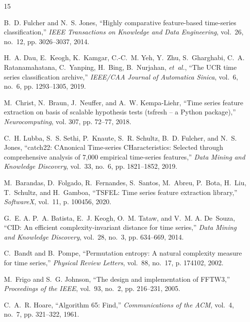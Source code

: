 \documentclass[conference]{IEEEtran}
\begin{document}
\begin{thebibliography}{15}

B.~D. Fulcher and N.~S. Jones, ``Highly comparative feature-based time-series classification,'' \emph{IEEE Transactions on Knowledge and Data Engineering}, vol.~26, no.~12, pp. 3026--3037, 2014.

H.~A. Dau, E.~Keogh, K.~Kamgar, C.-C.~M. Yeh, Y.~Zhu, S.~Gharghabi, C.~A. Ratanamahatana, C.~Yanping, H.~Bing, B.~Nurjahan, \emph{et~al.}, ``The {UCR} time series classification archive,'' \emph{IEEE/CAA Journal of Automatica Sinica}, vol.~6, no.~6, pp. 1293--1305, 2019.

M.~Christ, N.~Braun, J.~Neuffer, and A.~W. Kempa-Liehr, ``Time series feature extraction on basis of scalable hypothesis tests (tsfresh -- a {Python} package),'' \emph{Neurocomputing}, vol. 307, pp. 72--77, 2018.

C.~H. Lubba, S.~S. Sethi, P.~Knaute, S.~R. Schultz, B.~D. Fulcher, and N.~S. Jones, ``catch22: {CAnonical Time-series CHaracteristics}: Selected through comprehensive analysis of 7,000 empirical time-series features,'' \emph{Data Mining and Knowledge Discovery}, vol.~33, no.~6, pp. 1821--1852, 2019.

M.~Barandas, D.~Folgado, R.~Fernandes, S.~Santos, M.~Abreu, P.~Bota, H.~Liu, T.~Schultz, and H.~Gamboa, ``{TSFEL}: Time series feature extraction library,'' \emph{SoftwareX}, vol.~11, p. 100456, 2020.

G.~E. A. P.~A. Batista, E.~J. Keogh, O.~M. Tataw, and V.~M. A. De~Souza, ``{CID}: An efficient complexity-invariant distance for time series,'' \emph{Data Mining and Knowledge Discovery}, vol.~28, no.~3, pp. 634--669, 2014.

C.~Bandt and B.~Pompe, ``Permutation entropy: A natural complexity measure for time series,'' \emph{Physical Review Letters}, vol.~88, no.~17, p. 174102, 2002.

M.~Frigo and S.~G. Johnson, ``The design and implementation of {FFTW3},'' \emph{Proceedings of the IEEE}, vol.~93, no.~2, pp. 216--231, 2005.

C.~A.~R. Hoare, ``Algorithm 65: Find,'' \emph{Communications of the ACM}, vol.~4, no.~7, pp. 321--322, 1961.


\end{thebibliography}
\end{document}
